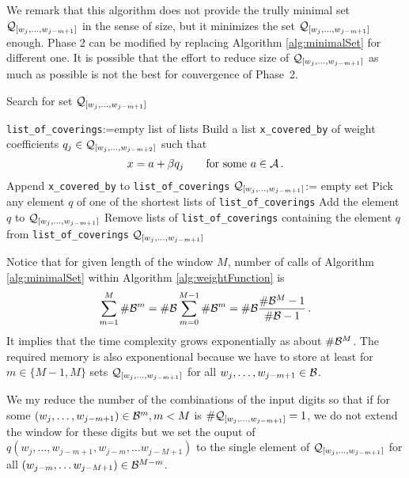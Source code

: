 We remark that this algorithm does not provide the trully minimal set $\mathcal{Q}_{[w_j,\dots, w_{j-m+1}]}$ in the sense of size, but it minimizes the set $\mathcal{Q}_{[w_j,\dots, w_{j-m+1}]}$ enough. Phase 2 can be modified by replacing Algorithm \ref{alg:minimalSet} for different one. It is possible that the effort to reduce size of  $\mathcal{Q}_{[w_j,\dots, w_{j-m+1}]}$ as much as possible is not the best for convergence of Phase~2.
\begin{algorithm}
  \caption{Search for set $\mathcal{Q}_{[w_j,\dots, w_{j-m+1}]}$ }
    \label{alg:minimalSet}
  \begin{algorithmic}[1]
    \STATE \verb+list_of_coverings+:=empty list of lists
        \STATE Build a list \verb+x_covered_by+ of weight coefficients $q_j \in \mathcal{Q}_{[w_j,\dots, w_{j-m+2}]}$ such that 
        $$
        x=a+ \beta q_j \qquad\text{for some } a\in\mathcal{A}\,.
        $$ 
        \vspace{-20pt}
        \STATE Append \verb+x_covered_by+ to \verb+list_of_coverings+
    \ENDFOR
    \STATE $\mathcal{Q}_{[w_j,\dots, w_{j-m+1}]}$:= empty set
        \STATE Pick any element $q$ of one of the shortest lists of \verb+list_of_coverings+
        \STATE Add the element $q$ to $\mathcal{Q}_{[w_j,\dots, w_{j-m+1}]}$
        \STATE Remove lists of \verb+list_of_coverings+ containing the element $q$ from \verb+list_of_coverings+
    \ENDWHILE
    \RETURN $\mathcal{Q}_{[w_j,\dots, w_{j-m+1}]}$
  \end{algorithmic}
\end{algorithm}

Notice that for given length of the window $M$, number of calls of Algorithm \ref{alg:minimalSet} within Algorithm \ref{alg:weightFunction} is
$$
\sum_{m=1}^M  \#\mathcal{B}^m = \#\mathcal{B} \sum_{m=0}^{M-1}  \#\mathcal{B}^m = \#\mathcal{B} \frac{\#\mathcal{B}^M-1}{\#\mathcal{B}-1}\,.
$$    
It implies that the time complexity grows exponentially as about $\#\mathcal{B}^M$. The required memory is also exponentional because we have to store at least for $m\in\{M-1,M\}$ sets $\mathcal{Q}_{[w_j,\dots, w_{j-m+1}]}$ for all $w_j,\dots, w_{j-m+1} \in \mathcal{B}$.

We my reduce the number of the combinations of the input digits so that if for some $(w_j,\dots, w_{j-m+1})\in\mathcal{B}^m, m<M$ is  $\#\mathcal{Q}_{[w_j,\dots, w_{j-m+1}]}=1$, we do not extend the window for these digits but we set the ouput of $q(w_j,\dots, w_{j-m+1}, w_{j-m}, \dots w_{j-M+1})$ to the single element of $\mathcal{Q}_{[w_j,\dots, w_{j-m+1}]}$ for all $(w_{j-m}, \dots w_{j-M+1})\in \mathcal{B}^{M-m}$. 

















